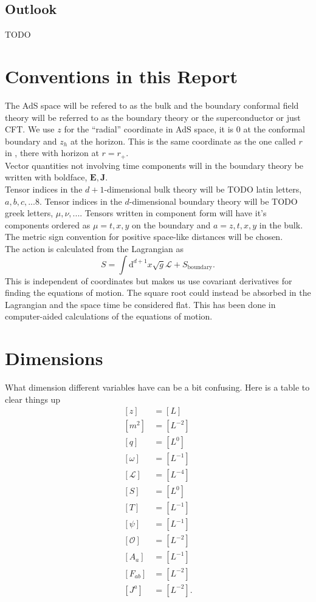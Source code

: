 \documentclass[12pt]{report}
\renewcommand{\d}{\ensuremath{\mathrm{d}}}
\renewcommand{\L}{\ensuremath{\mathcal{L}}}
\begin{document}
\section{Outlook}
TODO
\begin{appendices}
\chapter{Conventions in this Report\label{conventions}}
The AdS space will be refered to as the bulk and the boundary conformal field theory will be referred to as the boundary theory or the superconductor or just CFT. We use $z$ for the ``radial'' coordinate in AdS space, it is 0 at the conformal boundary and $z_h$ at the horizon. This is the same coordinate as the one called $r$ in \cite{hartnoll8}, there with horizon at $r=r_+$.\\
Vector quantities not involving time components will in the boundary theory be written with boldface, $\mathbf{E}, \mathbf{J}$.\\
Tensor indices in the $d+1$-dimensional bulk theory will be TODO latin letters, $a,b,c,...8$. Tensor indices in the $d$-dimensional boundary theory will be TODO greek letters, $\mu,\nu,...$. Tensors written in component form will have it's components ordered as $\mu=t,x,y$ on the boundary and $a=z,t,x,y$ in the bulk.
The metric sign convention for positive space-like distances will be chosen.\\
The action is calculated from the Lagrangian as
\begin{equation}
 S=\int\d^{d+1} x\sqrt{g}\L+S_\mathrm{boundary}.
\end{equation}
This is independent of coordinates but makes us use covariant derivatives for finding the equations of motion. The square root could instead be absorbed in the Lagrangian and the space time be considered flat. This has been done in computer-aided calculations of the equations of motion.
\chapter{Dimensions}
What dimension different variables have can be a bit confusing. Here is a table to clear things up
\begin{equation}
 \begin{split}
[z]&=[L]\\
[m^2]&=[L^{-2}]\\
[q]&=[L^{0}]\\
[\omega]&=[L^{-1}]\\
[\mathcal{L}]&=[L^{-4}]\\
[S]&=[L^0]\\
[T]&=[L^{-1}]\\
[\psi]&=[L^{-1}]\\
[\mathcal{O}]&=[L^{-2}]\\
[A_a]&=[L^{-1}]\\
[F_{ab}]&=[L^{-2}]\\
[J^a]&=[L^{-2}].
 \end{split}
\end{equation}



\end{appendices}
\end{document}
